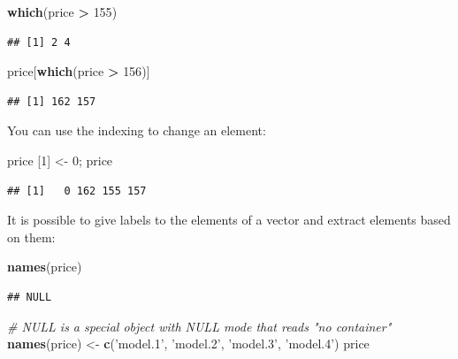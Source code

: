 \documentclass[]{book}
\newenvironment{Shaded}{\begin{snugshade}}{\end{snugshade}}
\newcommand{\CommentTok}[1]{\textcolor[rgb]{0.56,0.35,0.01}{\textit{#1}}}
\newcommand{\DecValTok}[1]{\textcolor[rgb]{0.00,0.00,0.81}{#1}}
\newcommand{\KeywordTok}[1]{\textcolor[rgb]{0.13,0.29,0.53}{\textbf{#1}}}
\newcommand{\NormalTok}[1]{#1}
\newcommand{\OperatorTok}[1]{\textcolor[rgb]{0.81,0.36,0.00}{\textbf{#1}}}
\newcommand{\StringTok}[1]{\textcolor[rgb]{0.31,0.60,0.02}{#1}}
\begin{document}
\begin{Shaded}
\begin{Highlighting}[]
\KeywordTok{which}\NormalTok{(price }\OperatorTok{>}\StringTok{ }\DecValTok{155}\NormalTok{)}
\end{Highlighting}
\end{Shaded}

\begin{verbatim}
## [1] 2 4
\end{verbatim}

\begin{Shaded}
\begin{Highlighting}[]
\NormalTok{price[}\KeywordTok{which}\NormalTok{(price }\OperatorTok{>}\StringTok{ }\DecValTok{156}\NormalTok{)]}
\end{Highlighting}
\end{Shaded}

\begin{verbatim}
## [1] 162 157
\end{verbatim}

You can use the indexing to change an element:

\begin{Shaded}
\begin{Highlighting}[]
\NormalTok{price [}\DecValTok{1}\NormalTok{] <-}\StringTok{ }\DecValTok{0}\NormalTok{; price}
\end{Highlighting}
\end{Shaded}

\begin{verbatim}
## [1]   0 162 155 157
\end{verbatim}

It is possible to give labels to the elements of a vector and extract elements based on them:

\begin{Shaded}
\begin{Highlighting}[]
\KeywordTok{names}\NormalTok{(price) }
\end{Highlighting}
\end{Shaded}

\begin{verbatim}
## NULL
\end{verbatim}

\begin{Shaded}
\begin{Highlighting}[]
\CommentTok{# NULL is a special object with NULL mode that reads "no container"}
\KeywordTok{names}\NormalTok{(price) <-}\StringTok{ }\KeywordTok{c}\NormalTok{(}\StringTok{'model.1'}\NormalTok{, }\StringTok{'model.2'}\NormalTok{, }\StringTok{'model.3'}\NormalTok{, }\StringTok{'model.4'}\NormalTok{)}
\NormalTok{price}
\end{Highlighting}
\end{Shaded}
\end{document}
